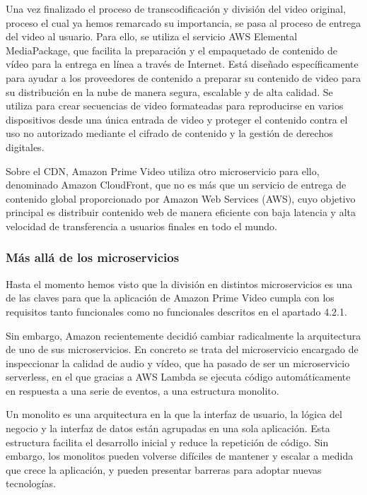 \documentclass[12pt,a4paper]{article}
\begin{document}
    Una vez finalizado el proceso de transcodificación y división del video original, proceso el cual ya hemos remarcado su importancia, se pasa al proceso de entrega del video al usuario. Para ello, se utiliza el servicio AWS Elemental MediaPackage, que facilita la preparación y el empaquetado de contenido de vídeo para la entrega en línea a través de Internet. Está diseñado específicamente para ayudar a los proveedores de contenido a preparar su contenido de video para su distribución en la nube de manera segura, escalable y de alta calidad. Se utiliza para crear secuencias de video formateadas para reproducirse en varios dispositivos desde una única entrada de video y proteger el contenido contra el uso no autorizado mediante el cifrado de contenido y la gestión de derechos digitales.

    Sobre el CDN, Amazon Prime Video utiliza otro microservicio para ello, denominado Amazon CloudFront, que no es más que un servicio de entrega de contenido global proporcionado por Amazon Web Services (AWS), cuyo objetivo principal es distribuir contenido web de manera eficiente con baja latencia y alta velocidad de transferencia a usuarios finales en todo el mundo.

    \subsubsection{Más allá de los microservicios}

    Hasta el momento hemos visto que la división en distintos microservicios es una de las claves para que la aplicación de Amazon Prime Video cumpla con los requisitos tanto funcionales como no funcionales descritos en el apartado 4.2.1.

    Sin embargo, Amazon recientemente decidió cambiar radicalmente la arquitectura de uno de sus microservicios. En concreto se trata del microservicio encargado de inspeccionar la calidad de audio y vídeo, que ha pasado de ser un microservicio serverless, en el que gracias a AWS Lambda se ejecuta código automáticamente en respuesta a una serie de eventos, a una estructura monolito. \cite{ibrahim2023}

    Un monolito es una arquitectura en la que la interfaz de usuario, la lógica del negocio y la interfaz de datos están agrupadas en una sola aplicación. Esta estructura facilita el desarrollo inicial y reduce la repetición de código. Sin embargo, los monolitos pueden volverse difíciles de mantener y escalar a medida que crece la aplicación, y pueden presentar barreras para adoptar nuevas tecnologías.
\end{document}
